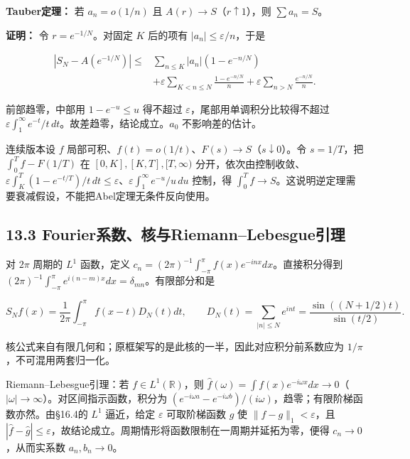 \documentclass[11pt,a4paper]{article}
\begin{document}
\textbf{Tauber定理：} 若 \(a_n=o(1/n)\) 且
\(A(r)\to S\)（\(r\uparrow1\)），则 \(\sum a_n=S\)。

\textbf{证明：} 令 \(r=e^{-1/N}\)。对固定 \(K\) 后的项有
\(|a_n|\le\varepsilon/n\)，于是

\[
\begin{aligned}
|S_N-A(e^{-1/N})|
\le{}&\sum_{n\le K}|a_n|(1-e^{-n/N})\\
&+\varepsilon\sum_{K<n\le N}\frac{1-e^{-n/N}}n
+\varepsilon\sum_{n>N}\frac{e^{-n/N}}n.
\end{aligned}
\]

前部趋零，中部用 \(1-e^{-u}\le u\) 得不超过
\(\varepsilon\)，尾部用单调积分比较得不超过
\(\varepsilon\int_1^\infty e^{-t}/t\,dt\)。故差趋零，结论成立。\(a_0\)
不影响差的估计。

连续版本设 \(f\)
局部可积、\(f(t)=o(1/t)\)、\(F(s)\to S\)（\(s\downarrow0\)）。令
\(s=1/T\)，把 \(\int_0^Tf-F(1/T)\) 在 \([0,K],[K,T],[T,\infty)\)
分开，依次由控制收敛、\(\varepsilon\int_K^T(1-e^{-t/T})/t\,dt\le\varepsilon\)、\(\varepsilon\int_1^\infty e^{-u}/u\,du\)
控制，得
\(\int_0^Tf\to S\)。这说明逆定理需要衰减假设，不能把Abel定理无条件反向使用。

\subsection{13.3
Fourier系数、核与Riemann--Lebesgue引理}\label{fourierux7cfbux6570ux6838ux4e0eriemannlebesgueux5f15ux7406}

对 \(2\pi\) 周期的 \(L^1\) 函数，定义
\(c_n=(2\pi)^{-1}\int_{-\pi}^\pi f(x)e^{-inx}dx\)。直接积分得到
\((2\pi)^{-1}\int_{-\pi}^\pi e^{i(n-m)x}dx=\delta_{mn}\)。有限部分和是

\[
S_Nf(x)=\frac1{2\pi}\int_{-\pi}^{\pi}f(x-t)D_N(t)dt,\qquad
D_N(t)=\sum_{|n|\le N}e^{int}=\frac{\sin((N+1/2)t)}{\sin(t/2)}.\tag{13.3}
\]

核公式来自有限几何和；原框架写的是此核的一半，因此对应积分前系数应为
\(1/\pi\)，不可混用两套归一化。

Riemann--Lebesgue引理：若 \(f\in L^1(\mathbb R)\)，则
\(\widehat f(\omega)=\int f(x)e^{-i\omega x}dx\to0\)（\(|\omega|\to\infty\)）。对区间指示函数，积分为
\((e^{-i\omega a}-e^{-i\omega b})/(i\omega)\)，趋零；有限阶梯函数亦然。由§16.4的
\(L^1\) 逼近，给定 \(\varepsilon\) 可取阶梯函数 \(g\) 使
\(\|f-g\|_1<\varepsilon\)，且
\(|\widehat f-\widehat g|\le\varepsilon\)，故结论成立。周期情形将函数限制在一周期并延拓为零，便得
\(c_n\to0\)，从而实系数 \(a_n,b_n\to0\)。
\end{document}
